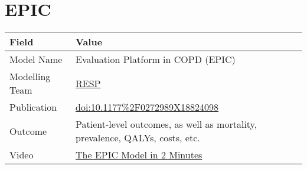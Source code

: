 \documentclass[
]{book}
\begin{document}
\hypertarget{epic}{%
\chapter{EPIC}\label{epic}}

\begin{longtable}[]{@{}ll@{}}
\toprule
\begin{minipage}[b]{0.45\columnwidth}\raggedright
Field\strut
\end{minipage} & \begin{minipage}[b]{0.49\columnwidth}\raggedright
Value\strut
\end{minipage}\tabularnewline
\midrule
\endhead
\begin{minipage}[t]{0.45\columnwidth}\raggedright
Model Name\strut
\end{minipage} & \begin{minipage}[t]{0.49\columnwidth}\raggedright
Evaluation Platform in COPD (EPIC)\strut
\end{minipage}\tabularnewline
\begin{minipage}[t]{0.45\columnwidth}\raggedright
Modelling Team\strut
\end{minipage} & \begin{minipage}[t]{0.49\columnwidth}\raggedright
\href{http://resp.core.ubc.ca}{RESP}\strut
\end{minipage}\tabularnewline
\begin{minipage}[t]{0.45\columnwidth}\raggedright
Publication\strut
\end{minipage} & \begin{minipage}[t]{0.49\columnwidth}\raggedright
\href{https://doi.org/10.1177\%2F0272989X18824098}{doi:10.1177\%2F0272989X18824098}\strut
\end{minipage}\tabularnewline
\begin{minipage}[t]{0.45\columnwidth}\raggedright
Outcome\strut
\end{minipage} & \begin{minipage}[t]{0.49\columnwidth}\raggedright
Patient-level outcomes, as well as mortality, prevalence, QALYs, costs, etc.\strut
\end{minipage}\tabularnewline
\begin{minipage}[t]{0.45\columnwidth}\raggedright
Video\strut
\end{minipage} & \begin{minipage}[t]{0.49\columnwidth}\raggedright
\href{https://www.peermodelsnetwork.com/educational-videos?wix-vod-video-id=b394fa69ae404fdeb2ceae17f308fbea\&wix-vod-comp-id=comp-k8q9lys1}{The EPIC Model in 2 Minutes}\strut

\end{minipage}
\end{longtable}
\end{document}

